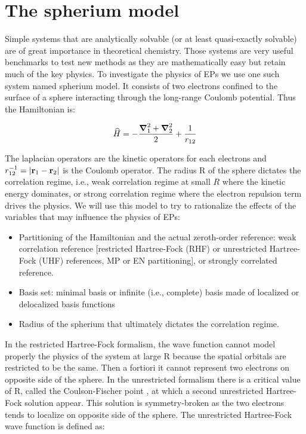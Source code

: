 \documentclass[11pt,a4paper]{article}
\begin{document}
\section{The spherium model}\label{sec:spherium}

Simple systems that are analytically solvable (or at least quasi-exactly solvable) are of great importance in theoretical chemistry. Those systems are very useful benchmarks to test new methods as they are mathematically easy but retain much of the key physics. To investigate the physics of EPs we use one such system named spherium model. It consists of two electrons confined to the surface of a sphere interacting through the long-range Coulomb potential. Thus the Hamiltonian is:

\begin{equation}
\widehat{H} = -\frac{\grad_1^2 + \grad_2^2}{2} + \frac{1}{r_{12}}
\end{equation}

The laplacian operators are the kinetic operators for each electrons and $r_{12}^{-1} = \abs{\vb{r}_1 - \vb{r}_2}$ is the Coulomb operator. The radius R of the sphere dictates the correlation regime, i.e., weak correlation regime at small $R$ where the kinetic energy dominates, or strong correlation regime where the electron repulsion term drives the physics. We will use this model to try to rationalize the effects of the variables that may influence the physics of EPs:
\begin{itemize}
	\item Partitioning of the Hamiltonian and the actual zeroth-order reference: weak correlation reference [restricted Hartree-Fock (RHF) or unrestricted Hartree-Fock (UHF) references, MP or EN partitioning], or strongly correlated reference.
	\item Basis set: minimal basis or infinite (i.e., complete) basis made of localized or delocalized basis functions
	\item Radius of the spherium that ultimately dictates the correlation regime.
\end{itemize}

In the restricted Hartree-Fock formalism, the wave function cannot model properly the physics of the system at large R because the spatial orbitals are restricted to be the same. Then a fortiori it cannot represent two electrons on opposite side of the sphere. In the unrestricted formalism there is a critical value of R, called the Coulson-Fischer point \cite{Coulson_1949}, at which a second unrestricted Hartree-Fock solution appear. This solution is symmetry-broken as the two electrons tends to localize on opposite side of the sphere. The unrestricted Hartree-Fock wave function is defined as:
\end{document}
